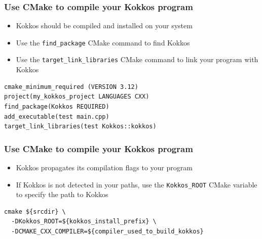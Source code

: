 \documentclass[aspectratio=169]{beamer}
\begin{document}

\begin{frame}[fragile]

\frametitle{Use CMake to compile your Kokkos program}

\begin{itemize}
    \item Kokkos should be compiled and installed on your system
    \item Use the \texttt{find\_package} CMake command to find Kokkos
    \item Use the \texttt{target\_link\_libraries} CMake command to link your program with Kokkos
\end{itemize}

\begin{verbatim}
cmake_minimum_required (VERSION 3.12)
project(my_kokkos_project LANGUAGES CXX)
find_package(Kokkos REQUIRED)
add_executable(test main.cpp)
target_link_libraries(test Kokkos::kokkos)
\end{verbatim}

\end{frame}


\begin{frame}[fragile]

\frametitle{Use CMake to compile your Kokkos program}

\begin{itemize}
    \item Kokkos propagates its compilation flags to your program
    \item If Kokkos is not detected in your paths, use the \texttt{Kokkos\_ROOT} CMake variable to specify the path to Kokkos
\end{itemize}

\small
\begin{verbatim}
cmake ${srcdir} \
  -DKokkos_ROOT=${kokkos_install_prefix} \
  -DCMAKE_CXX_COMPILER=${compiler_used_to_build_kokkos}
\end{verbatim}

\end{frame}

\end{document}
